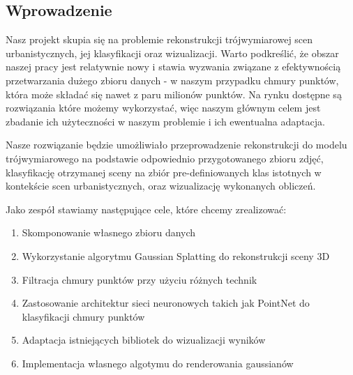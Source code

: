\subsection{Wprowadzenie}
Nasz projekt skupia się na problemie rekonstrukcji trójwymiarowej scen urbanistycznych, jej klasyfikacji oraz wizualizacji. Warto podkreślić, że obszar naszej pracy jest relatywnie nowy i stawia wyzwania związane z efektywnością przetwarzania dużego zbioru danych - w naszym przypadku chmury punktów, która może składać się nawet z paru milionów punktów. Na rynku dostępne są rozwiązania które możemy wykorzystać, więc naszym głównym celem jest zbadanie ich użyteczności w naszym problemie i ich ewentualna adaptacja. 

Nasze rozwiązanie będzie umożliwiało przeprowadzenie rekonstrukcji do modelu trójwymiarowego na podstawie odpowiednio przygotowanego zbioru zdjęć, klasyfikację otrzymanej sceny na zbiór pre-definiowanych klas istotnych w kontekście scen urbanistycznych, oraz wizualizację wykonanych obliczeń. 

\newpage

Jako zespół stawiamy następujące cele, które chcemy zrealizować:

\begin{enumerate}
    \item Skomponowanie własnego zbioru danych 
    \item Wykorzystanie algorytmu Gaussian Splatting do rekonstrukcji sceny 3D
    \item Filtracja chmury punktów przy użyciu różnych technik 
    \item Zastosowanie architektur sieci neuronowych takich jak PointNet do klasyfikacji chmury punktów 
    \item Adaptacja istniejących bibliotek do wizualizacji wyników 
    \item Implementacja własnego algotymu do renderowania gaussianów
\end{enumerate}